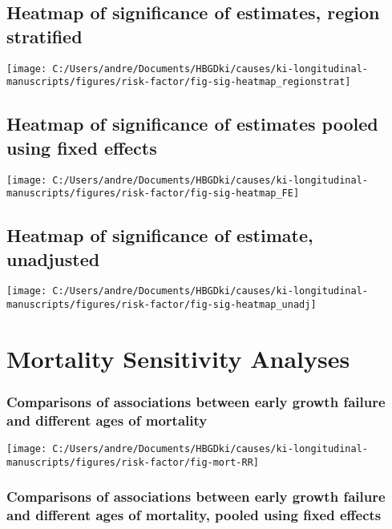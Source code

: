 \documentclass[9pt,]{book}
\begin{document}
\section{Heatmap of significance of estimates, region
stratified}\label{heatmap-of-significance-of-estimates-region-stratified}

\texttt{[image: C:/Users/andre/Documents/HBGDki/causes/ki-longitudinal-manuscripts/figures/risk-factor/fig-sig-heatmap\_regionstrat]}

\section{Heatmap of significance of estimates pooled using fixed
effects}\label{heatmap-of-significance-of-estimates-pooled-using-fixed-effects}

\texttt{[image: C:/Users/andre/Documents/HBGDki/causes/ki-longitudinal-manuscripts/figures/risk-factor/fig-sig-heatmap\_FE]}

\section{Heatmap of significance of estimate,
unadjusted}\label{heatmap-of-significance-of-estimate-unadjusted}

\texttt{[image: C:/Users/andre/Documents/HBGDki/causes/ki-longitudinal-manuscripts/figures/risk-factor/fig-sig-heatmap\_unadj]}

\chapter{Mortality Sensitivity Analyses}\label{mortality}

\raggedright

\subsection{Comparisons of associations between early growth failure and
different ages of
mortality}\label{comparisons-of-associations-between-early-growth-failure-and-different-ages-of-mortality}

\texttt{[image: C:/Users/andre/Documents/HBGDki/causes/ki-longitudinal-manuscripts/figures/risk-factor/fig-mort-RR]}

\subsection{Comparisons of associations between early growth failure and
different ages of mortality, pooled using fixed
effects}\label{comparisons-of-associations-between-early-growth-failure-and-different-ages-of-mortality-pooled-using-fixed-effects}
\end{document}
